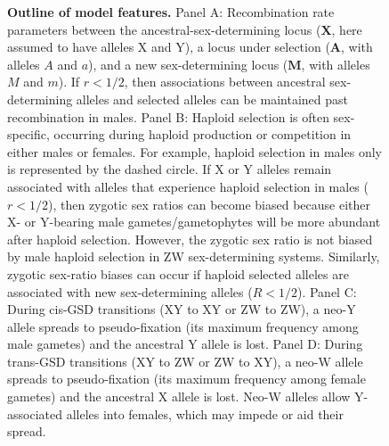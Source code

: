 \documentclass[10pt,letterpaper]{article}
\begin{document}
\begin{figure}[!h]
\caption{
{\bf Outline of model features.}
Panel A: Recombination rate parameters between the ancestral-sex-determining locus ($\mathbf{X}$, here assumed to have alleles X and Y), a locus under selection ($\mathbf{A}$, with alleles $A$ and $a$), and a new sex-determining locus ($\mathbf{M}$, with alleles $M$ and $m$). 
If $r<1/2$, then associations between ancestral sex-determining alleles and selected alleles can be maintained past recombination in males. 
Panel B: Haploid selection is often sex-specific, occurring during haploid production or competition in either males or females. 
For example, haploid selection in males only is represented by the dashed circle.  
If X or Y alleles remain associated with alleles that experience haploid selection in males ($r<1/2$), then zygotic sex ratios can become biased because either X- or Y-bearing male gametes/gametophytes will be more abundant after haploid selection. 
However, the zygotic sex ratio is not biased by male haploid selection in ZW sex-determining systems. 
Similarly, zygotic sex-ratio biases can occur if haploid selected alleles are associated with new sex-determining alleles ($R<1/2$). 
Panel C: During cis-GSD transitions (XY to XY or ZW to ZW), a neo-Y allele spreads to pseudo-fixation (its maximum frequency among male gametes) and the ancestral Y allele is lost. 
Panel D: During trans-GSD transitions (XY to ZW or ZW to XY), a neo-W allele spreads to pseudo-fixation (its maximum frequency among female gametes) and the ancestral X allele is lost. 
Neo-W alleles allow Y-associated alleles into females, which may impede or aid their spread. 
}
\label{fig:model_outline}
\end{figure}
\end{document}
